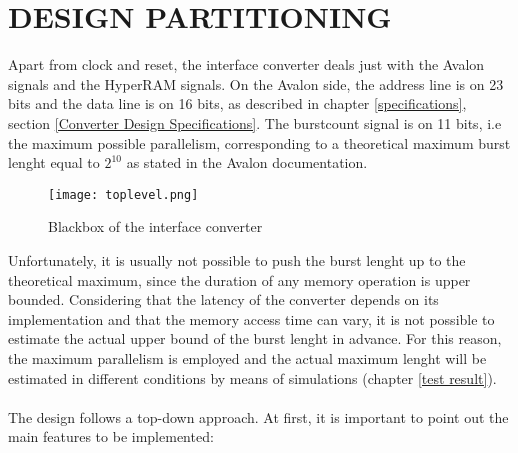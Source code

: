 \documentclass[10pt, english, a4paper, titlepage, oneside]{book}
\begin{document}
\chapter{DESIGN PARTITIONING}
\noindent Apart from clock and reset, the interface converter deals just with the Avalon signals and the HyperRAM signals. On the Avalon side, the address line is on 23 bits and the data line is on 16 bits, as described in chapter \ref{specifications}, section \ref{Converter Design Specifications}. The burstcount signal is on 11 bits, i.e the maximum possible parallelism, corresponding to a theoretical maximum burst lenght equal to $2^{10}$ as stated in the Avalon documentation. 
\vspace{6mm}
\begin{figure}[H]
    \centering
    \texttt{[image: toplevel.png]}
    \vspace{3mm}
    \caption{Blackbox of the interface converter}
    \label{toplevel}
\end{figure}
\vspace{4mm}
\noindent Unfortunately, it is usually not possible to push the burst lenght up to the theoretical maximum, since the duration of any memory operation is upper bounded. Considering that the latency of the converter depends on its implementation and that the memory access time can vary, it is not possible to estimate the actual upper bound of the burst lenght in advance. For this reason, the maximum parallelism is employed and the actual maximum lenght will be estimated in different conditions by means of simulations (chapter \ref{test result}).
\\ \\
\noindent The design follows a top-down approach. At first, it is important to point out the main features to be implemented:
\vspace{2mm}
\end{document}
